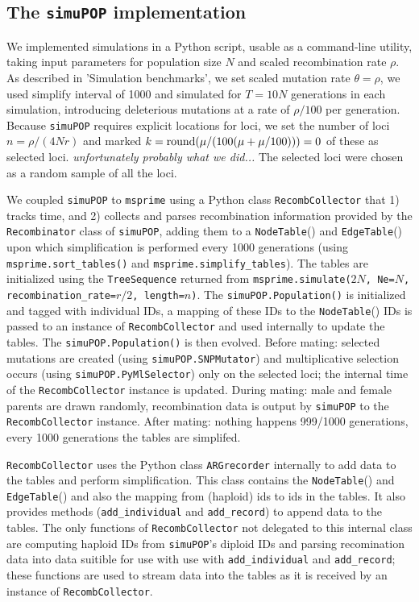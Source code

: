 \documentclass{article}
\newcommand{\simupop}{\texttt{simuPOP}}
\newcommand{\msprime}{\texttt{msprime}}
\newcommand{\tnodetable}[1]{\mbox{\texttt{NodeTable}}(#1)}
\newcommand{\tedgetable}[1]{\mbox{\texttt{EdgeTable}}(#1)}
\newcommand{\jda}[1]{{\em \color{cyan} #1}}
\begin{document}
\subsection*{The \simupop{} implementation}

We implemented simulations in a Python script, usable as a command-line utility,
taking input parameters for population size $N$ and scaled recombination rate $\rho$.
As described in 'Simulation benchmarks', we set scaled mutation rate $\theta=\rho$,
we used simplify interval of 1000 and simulated for $T=10N$ generations in each
simulation, introducing deleterious mutations at a rate of $\rho/100$ per
generation.
Because \simupop{} requires explicit locations for loci, we set the number of
loci $n=\rho / (4Nr)$ and marked
$k={\rm round}(\mu / (100 (\mu + \mu / 100))) = 0$ of these as selected loci.
\jda{unfortunately probably what we did...}
The selected loci were chosen as a random sample of all the loci.

We coupled \simupop{} to \msprime{} using a Python class \texttt{RecombCollector} that 1)
tracks time, and 2) collects and parses recombination information provided by
the \texttt{Recombinator} class of \simupop{}, adding them to a \tnodetable{} and
\tedgetable{} upon which simplification is performed every 1000 generations (using
\texttt{msprime.sort\_tables()} and \texttt{msprime.simplify\_tables}).
The tables are initialized using the \texttt{TreeSequence} returned from
\texttt{msprime.simulate($2N$, Ne=$N$, recombination\_rate=$r/2$, length=$n$)}.
The \texttt{simuPOP.Population()} is initialized and tagged with individual IDs,
a mapping of these IDs to the \tnodetable{} IDs is passed to
an instance of \texttt{RecombCollector} and used internally to update the tables.
The \texttt{simuPOP.Population()} is then evolved.
Before mating: selected mutations are created (using
\texttt{simuPOP.SNPMutator}) and multiplicative selection occurs (using
\texttt{simuPOP.PyMlSelector}) only on the selected loci;
the internal time of the \texttt{RecombCollector} instance is updated.
During mating: male and female parents are drawn randomly, recombination data is
output by \simupop{} to the \texttt{RecombCollector} instance.
After mating: nothing happens 999/1000 generations, every 1000 generations the tables are
simplifed.

\texttt{RecombCollector} uses the Python class \texttt{ARGrecorder} internally
to add data to the tables and perform simplification.
This class contains the \tnodetable{} and \tedgetable{} and also the mapping from
(haploid) ids to ids in the tables.
It also provides methods (\texttt{add\_individual} and \texttt{add\_record})
to append data to the tables.
The only functions of
\texttt{RecombCollector} not delegated to this internal class are computing
haploid IDs from \simupop{}'s diploid IDs and parsing recomination data into
data suitible for use with use with \texttt{add\_individual} and
\texttt{add\_record}; these functions are used to stream data into the tables as
it is received by an instance of \texttt{RecombCollector}.
\end{document}
